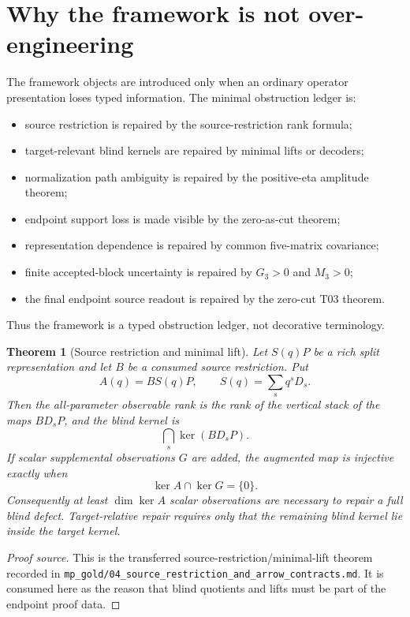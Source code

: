 \documentclass[11pt]{article}
\newtheorem{theorem}{Theorem}[section]
\begin{document}
\section{Why the framework is not over-engineering}

The framework objects are introduced only when an ordinary operator presentation loses typed information.  The minimal obstruction ledger is:
\begin{itemize}
\item source restriction is repaired by the source-restriction rank formula;
\item target-relevant blind kernels are repaired by minimal lifts or decoders;
\item normalization path ambiguity is repaired by the positive-eta amplitude theorem;
\item endpoint support loss is made visible by the zero-as-cut theorem;
\item representation dependence is repaired by common five-matrix covariance;
\item finite accepted-block uncertainty is repaired by \(G_3>0\) and \(M_3>0\);
\item the final endpoint source readout is repaired by the zero-cut T03 theorem.
\end{itemize}
Thus the framework is a typed obstruction ledger, not decorative terminology.

\begin{theorem}[Source restriction and minimal lift]
Let \(S(q)P\) be a rich split representation and let \(B\) be a consumed source restriction.  Put
\[
A(q)=B S(q)P,
\qquad
S(q)=\sum_s q^sD_s.
\]
Then the all-parameter observable rank is the rank of the vertical stack of the maps \(BD_sP\), and the blind kernel is
\[
\bigcap_s\ker(BD_sP).
\]
If scalar supplemental observations \(G\) are added, the augmented map is injective exactly when
\[
\ker A\cap\ker G=\{0\}.
\]
Consequently at least \(\dim\ker A\) scalar observations are necessary to repair a full blind defect.  Target-relative repair requires only that the remaining blind kernel lie inside the target kernel.
\end{theorem}

\begin{proof}[Proof source]
This is the transferred source-restriction/minimal-lift theorem recorded in \texttt{mp\_gold/04\_source\_restriction\_and\_arrow\_contracts.md}.  It is consumed here as the reason that blind quotients and lifts must be part of the endpoint proof data.
\end{proof}
\end{document}
